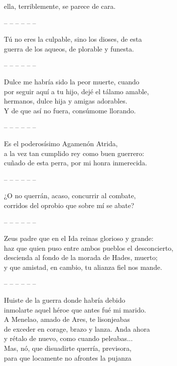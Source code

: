 ella, terriblemente, se parece de cara.\par
\pend
%
\noindent-- -- -- -- -- --\par
%
\pstart
{}
Tú no eres la culpable, sino los dioses, de esta\\
guerra de los aqueos, de plorable y funesta.\par
\pend
%
\noindent-- -- -- -- -- --\par
%
\pstart
{}
Dulce me habría sido la peor muerte, cuando\\
por seguir aquí a tu hijo, dejé el tálamo amable,\\
hermanos, dulce hija y amigas adorables.\\
Y de que así no fuera, consúmome llorando.\par
\pend
%
\noindent-- -- -- -- -- --\par
%
\pstart
{}
Es el poderosísimo Agamenón Atrida,\\
a la vez tan cumplido rey como buen guerrero:\\
cuñado de esta perra, por mi honra inmerecida.\par
\pend
%
\noindent-- -- -- -- -- --\par
%
\pstart
{}
¿O no querrán, acaso, concurrir al combate,\\
corridos del oprobio que sobre mí se abate?\par
\pend
%
\noindent-- -- -- -- -- --\par
%
\pstart
{}
Zeus padre que en el Ida reinas glorioso y grande:\\
haz que quien puso entre ambos pueblos el desconcierto,\\
descienda al fondo de la morada de Hades, muerto;\\
y que amistad, en cambio, tu alianza fiel nos mande.\par
\pend
%
\noindent-- -- -- -- -- --\par
%
\pstart
{}
Huiste de la guerra donde habría debido\\
inmolarte aquel héroe que antes fué mi marido.\\
A Menelao, amado de Ares, te lisonjeabas\\
de exceder en corage, brazo y lanza. Anda ahora\\
y rétalo de nuevo, como cuando peleabas...\\
Mas, nó, que disuadirte querría, previsora,\\
para que locamente no afrontes la pujanza\\
